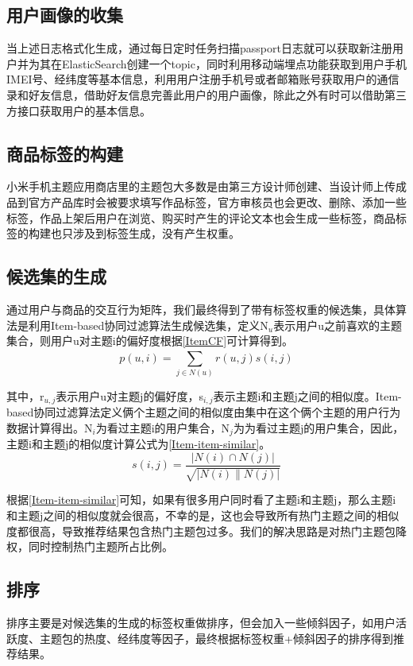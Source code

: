     \subsection{用户画像的收集}
    当上述日志格式化生成，通过每日定时任务扫描passport日志就可以获取新注册用户并为其在ElasticSearch创建一个topic，同时利用移动端埋点功能获取到用户手机IMEI号、经纬度等基本信息，利用用户注册手机号或者邮箱账号获取用户的通信录和好友信息，借助好友信息完善此用户的用户画像，除此之外有时可以借助第三方接口获取用户的基本信息。

    \subsection{商品标签的构建}
    小米手机主题应用商店里的主题包大多数是由第三方设计师创建、当设计师上传成品到官方产品库时会被要求填写作品标签，官方审核员也会更改、删除、添加一些标签，作品上架后用户在浏览、购买时产生的评论文本也会生成一些标签，商品标签的构建也只涉及到标签生成，没有产生权重。

    \subsection{候选集的生成}
    通过用户与商品的交互行为矩阵，我们最终得到了带有标签权重的候选集，具体算法是利用Item-based协同过滤算法生成候选集，定义N$_u$表示用户u之前喜欢的主题集合，则用户u对主题i的偏好度根据\autoref{ItemCF}可计算得到。
    \begin{equation}
    p(u,i)=\sum \limits _{j\in N(u)}^{} r(u,j)s(i,j)
    \label{ItemCF}
    \end{equation}

    其中，r$_{u,j}$表示用户u对主题j的偏好度，s$_{i,j}$表示主题i和主题j之间的相似度。Item-based协同过滤算法定义俩个主题之间的相似度由集中在这个俩个主题的用户行为数据计算得出。N$_{i}$为看过主题i的用户集合，N$_{j}$为为看过主题j的用户集合，因此，主题i和主题j的相似度计算公式为\autoref{Item-item-similar}。
    \begin{equation}
    s(i,j)=\frac{\left | N(i)\cap N(j) \right |}{\sqrt{\left | N(i) \parallel N(j) \right |}}
    \label{Item-item-similar}
    \end{equation}

    根据\autoref{Item-item-similar}可知，如果有很多用户同时看了主题i和主题j，那么主题i和主题j之间的相似度就会很高，不幸的是，这也会导致所有热门主题之间的相似度都很高，导致推荐结果包含热门主题包过多。我们的解决思路是对热门主题包降权，同时控制热门主题所占比例。

    \subsection{排序}
    排序主要是对候选集的生成的标签权重做排序，但会加入一些倾斜因子，如用户活跃度、主题包的热度、经纬度等因子，最终根据标签权重+倾斜因子的排序得到推荐结果。

